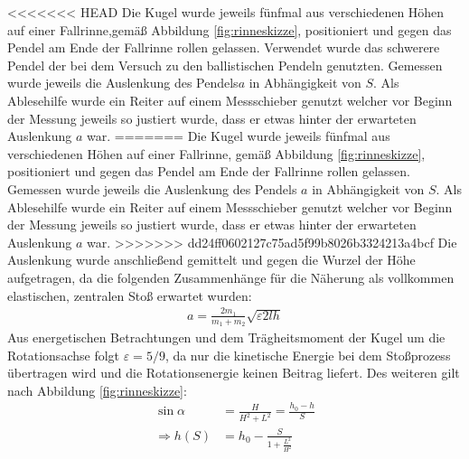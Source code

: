 <<<<<<< HEAD
Die Kugel wurde jeweils fünfmal aus verschiedenen Höhen auf einer Fallrinne,gemäß Abbildung \ref{fig:rinneskizze}, positioniert und gegen das Pendel am Ende der Fallrinne rollen gelassen. Verwendet wurde das schwerere Pendel der bei dem Versuch zu den ballistischen Pendeln genutzten. Gemessen wurde jeweils die Auslenkung des Pendels$a$ in Abhängigkeit von $S$. Als Ablesehilfe wurde ein Reiter auf einem Messschieber genutzt welcher vor Beginn der Messung jeweils so justiert wurde, dass er etwas hinter der erwarteten Auslenkung $a$ war.
=======
Die Kugel wurde jeweils fünfmal aus verschiedenen Höhen auf einer Fallrinne, gemäß Abbildung \ref{fig:rinneskizze}, positioniert und gegen das Pendel am Ende der Fallrinne rollen gelassen. Gemessen wurde jeweils die Auslenkung des Pendels $a$ in Abhängigkeit von $S$. Als Ablesehilfe wurde ein Reiter auf einem Messschieber genutzt welcher vor Beginn der Messung jeweils so justiert wurde, dass er etwas hinter der erwarteten Auslenkung $a$ war.
>>>>>>> dd24ff0602127c75ad5f99b8026b3324213a4bcf
Die Auslenkung wurde anschließend gemittelt und gegen die Wurzel der Höhe aufgetragen, da die folgenden Zusammenhänge für die Näherung als vollkommen elastischen, zentralen Stoß erwartet wurden:
\begin{align}
a=\frac{2m_1}{m_1+m_2}\sqrt{\varepsilon 2 l h} \label{eq:alenkrinne}
\end{align}
Aus energetischen Betrachtungen und dem Trägheitsmoment der Kugel um die Rotationsachse folgt $\varepsilon= 5/9$, da nur die kinetische Energie  bei dem Stoßprozess übertragen wird und die Rotationsenergie keinen Beitrag liefert.
Des weiteren gilt nach Abbildung \ref{fig:rinneskizze}:
\begin{align}
\sin \alpha &=\frac{H}{H^2+L^2}=\frac{h_0-h}{S} \\
\Rightarrow  h(S) &= h_0-\frac{S}{1+\frac{L^2}{H^2}}
\end{align}













